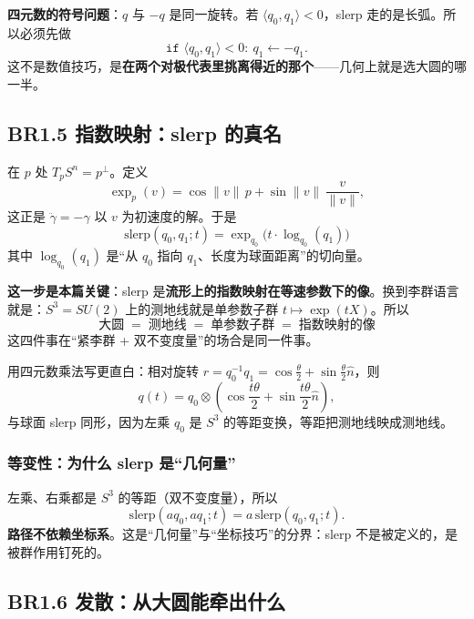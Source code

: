 \textbf{四元数的符号问题}：$q$ 与 $-q$ 是同一旋转。若 $\langle q_0,q_1\rangle<0$，slerp 走的是长弧。所以必须先做
\[
\texttt{if }\langle q_0,q_1\rangle<0:\ q_1\gets -q_1 .
\]
这不是数值技巧，是\textbf{在两个对极代表里挑离得近的那个}——几何上就是选大圆的哪一半。

\subsection{BR1.5 指数映射：slerp 的真名}

在 $p$ 处 $T_pS^n=p^\perp$。定义
\[
\exp_p(v)=\cos\lVert v\rVert\,p+\sin\lVert v\rVert\,\frac{v}{\lVert v\rVert},
\]
这正是 $\ddot\gamma=-\gamma$ 以 $v$ 为初速度的解。于是
\[
\boxed{\ \mathrm{slerp}(q_0,q_1;t)=\exp_{q_0}\big(t\cdot\log_{q_0}(q_1)\big)\ }
\]
其中 $\log_{q_0}(q_1)$ 是“从 $q_0$ 指向 $q_1$、长度为球面距离”的切向量。

\textbf{这一步是本篇关键}：slerp 是\textbf{流形上的指数映射在等速参数下的像}。换到李群语言就是：$S^3=SU(2)$ 上的测地线就是单参数子群 $t\mapsto\exp(tX)$。所以
\[
\text{大圆}\;=\;\text{测地线}\;=\;\text{单参数子群}\;=\;\text{指数映射的像}
\]
这四件事在“紧李群 + 双不变度量”的场合是同一件事。

用四元数乘法写更直白：相对旋转 $r=q_0^{-1}q_1=\cos\frac\theta2+\sin\frac\theta2\hat n$，则
\[
q(t)=q_0\otimes\left(\cos\frac{t\theta}{2}+\sin\frac{t\theta}{2}\hat n\right),
\]
与球面 slerp 同形，因为左乘 $q_0$ 是 $S^3$ 的等距变换，等距把测地线映成测地线。

\subsubsection{等变性：为什么 slerp 是“几何量”}

左乘、右乘都是 $S^3$ 的等距（双不变度量），所以
\[
\mathrm{slerp}(aq_0,aq_1;t)=a\,\mathrm{slerp}(q_0,q_1;t).
\]
\textbf{路径不依赖坐标系}。这是“几何量”与“坐标技巧”的分界：slerp 不是被定义的，是被群作用钉死的。

\subsection{BR1.6 发散：从大圆能牵出什么}

